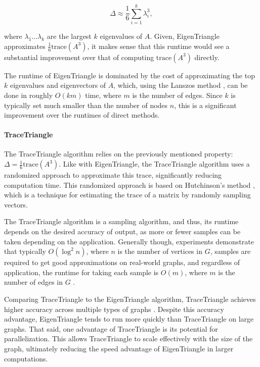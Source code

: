 \documentclass[11pt, margin=1in]{article}
\begin{document}
\[
\Delta \approx \frac{1}{6} \sum_{i=1}^{k} \lambda_i^3,
\]

where $\lambda_1 \ldots \lambda_k$ are the largest $k$ eigenvalues of $A$.
Given, EigenTriangle approximates $\frac{1}{6}\mathrm{trace}(A^3)$, it makes sense that this runtime would see a substantial improvement over that of computing $\mathrm{trace}(A^3)$ directly.

The runtime of EigenTriangle is dominated by the cost of approximating the top $k$ eigenvalues and eigenvectors of $A$, which, using the Lanszos method \cite{cullum_lanczos_2002}, can be done in roughly $O(k m)$ time, where $m$ is the number of edges.
Since $k$ is typically set much smaller than the number of nodes $n$, this is a significant improvement over the runtimes of direct methods.

\paragraph{TraceTriangle}

The TraceTriangle algorithm \cite{avron_counting_2010} relies on the previously mentioned property: $\Delta = \frac{1}{6} \mathrm{trace}(A^3)$.
Like with EigenTriangle, the TraceTriangle algorithm uses a randomized approach to approximate this trace, significantly reducing computation time.
This randomized approach is based on Hutchinson's method \cite{hutchinson_stochastic_1990}, which is a technique for estimating the trace of a matrix by randomly sampling vectors.

The TraceTriangle algorithm is a sampling algorithm, and thus, its runtime depends on the desired accuracy of output, as more or fewer samples can be taken depending on the application.
Generally though, experiments demonstrate that typically $O(\log^2{n})$, where $n$ is the number of vertices in $G$, samples are required to get good approximations on real-world graphs, and regardless of application, the runtime for taking each sample is $O(m)$, where $m$ is the number of edges in $G$ \cite{avron_counting_2010}.

Comparing TraceTriangle to the EigenTriangle algorithm, TraceTriangle achieves higher accuracy across multiple types of graphs \cite{avron_counting_2010}.
Despite this accuracy advantage, EigenTriangle tends to run more quickly than TraceTriangle on large graphs.
That said, one advantage of TraceTriangle is its potential for parallelization.
This allows TraceTriangle to scale effectively with the size of the graph, ultimately reducing the speed advantage of EigenTriangle in larger computations.
\end{document}
